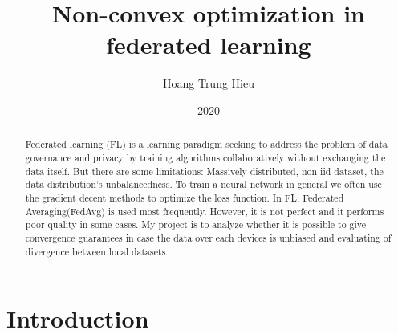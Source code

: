 \documentclass{article}
\theoremstyle{theorem}
\theoremstyle{definition}
\begin{document}
	\newpage
	\title{Non-convex optimization in federated learning}
	
	\author{Hoang Trung Hieu
	}                      
	\date{2020}
	\maketitle
	
	\noindent
	\begin{abstract}
		Federated learning (FL) is a learning paradigm seeking to address the problem of data governance and privacy by training algorithms collaboratively without exchanging the data itself. But there are some limitations: Massively distributed, non-iid dataset, the data distribution's unbalancedness. To train a neural network in general we often use the gradient decent methods to optimize the loss function. In FL, Federated Averaging(FedAvg) is used most frequently. However, it is not perfect and it performs poor-quality in some cases. My project is to analyze whether it is possible to give convergence guarantees in case the data over each devices is unbiased and evaluating of divergence between local datasets.
	\end{abstract}
	\section{Introduction}
\end{document}
